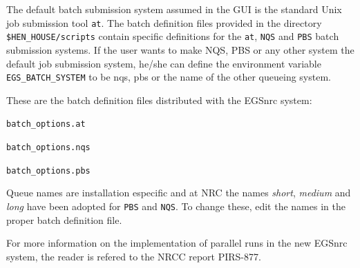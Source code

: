 \documentclass[12pt,twoside]{article}   %
\begin{document}
The default batch submission system assumed in the GUI is the standard Unix
job submission tool {\tt at}. The batch definition files provided in the directory 
{\tt \$HEN\_HOUSE/scripts} contain specific definitions for the {\tt at}, 
{\tt NQS} and {\tt PBS} batch submission systems. If the user wants to make NQS, PBS or 
any other system the default job submission system,
he/she can define the environment variable {\tt EGS\_BATCH\_SYSTEM} to be nqs, pbs or
the name of the other queueing system.

These are the batch definition files distributed with the EGSnrc system:
\begin{description}
\item {\tt batch\_options.at}
\item {\tt batch\_options.nqs}
\item {\tt batch\_options.pbs}
\end{description}

Queue names are installation especific and at NRC the 
names {\em short}, {\em medium} and {\em long} have been adopted for {\tt PBS} and {\tt NQS}. 
To change these, edit the names
in the proper batch definition file.

For more information on the implementation of parallel runs in the new EGSnrc system, the reader
is refered to the NRCC report PIRS-877.
\end{document}
